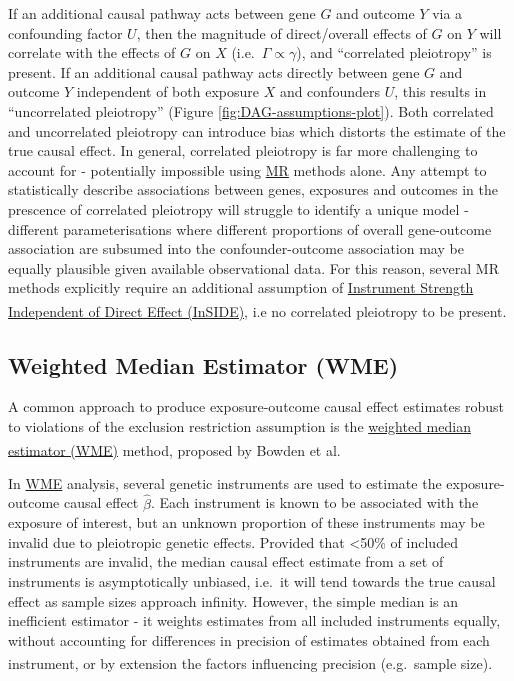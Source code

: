 \documentclass[
]{article}
\begin{document}
If an additional causal pathway acts between gene \(G\) and outcome \(Y\) via a confounding factor \(U\), then the magnitude of direct/overall effects of \(G\) on \(Y\) will correlate with the effects of \(G\) on \(X\) (i.e.~\(\Gamma \propto \gamma\)), and ``correlated pleiotropy'' is present. If an additional causal pathway acts directly between gene \(G\) and outcome \(Y\) independent of both exposure \(X\) and confounders \(U\), this results in ``uncorrelated pleiotropy'' (Figure \ref{fig:DAG-assumptions-plot}). Both correlated and uncorrelated pleiotropy can introduce bias which distorts the estimate of the true causal effect. In general, correlated pleiotropy is far more challenging to account for - potentially impossible using \hyperref[acronyms_MR]{MR} methods alone. Any attempt to statistically describe associations between genes, exposures and outcomes in the prescence of correlated pleiotropy will struggle to identify a unique model - different parameterisations where different proportions of overall gene-outcome association are subsumed into the confounder-outcome association may be equally plausible given available observational data. For this reason, several MR methods explicitly require an additional assumption of \hyperref[acronyms_InSIDE]{Instrument Strength Independent of Direct Effect (InSIDE)}, i.e no correlated pleiotropy to be present\textsuperscript{}.

\subsection{Weighted Median Estimator (WME)}\label{weighted-median-estimator-wme}

A common approach to produce exposure-outcome causal effect estimates robust to violations of the exclusion restriction assumption is the \hyperref[acronyms_WME]{weighted median estimator (WME)} method, proposed by Bowden et al\textsuperscript{}.

In \hyperref[acronyms_WME]{WME} analysis, several genetic instruments are used to estimate the exposure-outcome causal effect \(\hat{\beta}\). Each instrument is known to be associated with the exposure of interest, but an unknown proportion of these instruments may be invalid due to pleiotropic genetic effects. Provided that \textless50\% of included instruments are invalid, the median causal effect estimate from a set of instruments is asymptotically unbiased, i.e.~it will tend towards the true causal effect as sample sizes approach infinity. However, the simple median is an inefficient estimator - it weights estimates from all included instruments equally, without accounting for differences in precision of estimates obtained from each instrument, or by extension the factors influencing precision (e.g.~sample size)\textsuperscript{}.
\end{document}
